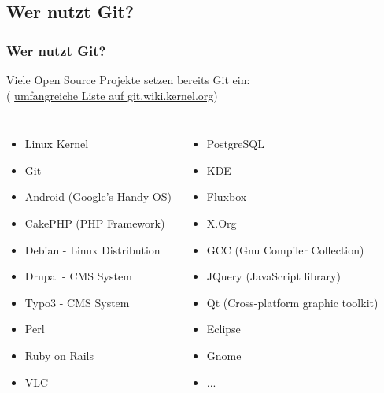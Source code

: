 \documentclass{beamer}
\begin{document}
\subsection{Wer nutzt Git?}

\begin{frame}\frametitle{Wer nutzt Git?}
Viele Open Source Projekte setzen bereits Git ein: \\
( \href{https://git.wiki.kernel.org/articles/g/i/t/GitProjects_8074.html}{umfangreiche Liste auf git.wiki.kernel.org})
\begin{columns}
                \begin{itemize}                
					\item Linux Kernel
					\item Git
					\item Android (Google's Handy OS) 
					\item CakePHP (PHP Framework) 
					\item Debian - Linux Distribution
					\item Drupal - CMS System
					\item Typo3 - CMS System
					\item Perl
					\item Ruby on Rails
	                \item VLC
                \end{itemize}
                \begin{itemize}
                \item PostgreSQL
                \item KDE
                \item Fluxbox
                \item X.Org
                \item GCC (Gnu Compiler Collection)
                \item JQuery (JavaScript library) 
                \item Qt (Cross-platform graphic toolkit)
                \item Eclipse
                \item Gnome
                \item ...
                \end{itemize}
\end{columns}

\end{frame}
\end{document}
